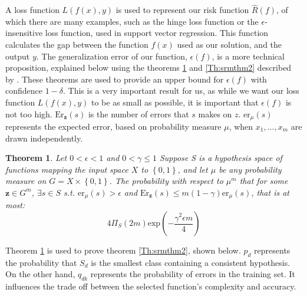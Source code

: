 A loss function $L(f(x),y)$ is used to represent our risk function $\hat{R}(f)$, of which there are many examples, such as the hinge loss function or the $\epsilon$-insensitive loss function, used in support vector regression. This function calculates the gap between the function $f(x)$ used as our solution, and the output $y$. \newline
The generalization error of our function, $\epsilon(f)$, is a more technical proposition, explained below using the theorems \ref{Th:srmthm1} and \ref{Th:srmthm2} described by \citet{shawetaylorsrm}. These theorems are used to provide an upper bound for $\epsilon(f)$ with confidence $1-\delta$. This is a very important result for us, as while we want our loss function $L(f(x),y)$ to be as small as possible, it is important that $\epsilon(f)$ is not too high. 
\newline
$\mathrm{Er}_{\mathbf{z}}(s)$ is the number of errors that $s$ makes on $z$. $\mathrm{er}_{\mu}(s)$ represents the expected error, based on probability measure $\mu$, when $x_1,\dots,x_m$ are drawn independently.

\newtheorem{srmtheorem}{Theorem}[section]
\begin{srmtheorem} \label{Th:srmthm1}
Let $0<\epsilon<1$ and $0<\gamma\leq1$ Suppose S is a hypothesis space of functions mapping the input space $X$ to $\left\{0,1\right\}$, and let $\mu$ be any probability measure on $G=X\times\left\{0,1\right\}$. The probability with respect to $\mu^m$ that for some $\mathbf{z}\in G^m$, $\exists s \in S$ s.t. $\mathrm{er}_{\mu}(s)>\epsilon$ and $\mathrm{Er}_{\mathbf{z}}(s)\leq m(1-\gamma)\mathrm{er}_{\mu}(s)$, that is at most:
\begin{equation}\label{srmeqn1}
4\Pi_{S}(2m)\mathrm{exp}\left(-\frac{\gamma^2\epsilon m}{4}\right)
\end{equation}
\end{srmtheorem}

Theorem \ref{Th:srmthm1} is used to prove theorem \ref{Th:srmthm2}, shown below. $p_{d}$ represents the probability that $S_d$ is the smallest class containing a consistent hypothesis. On the other hand, $q_{dk}$ represents the probability of errors in the training set. It influences the trade off between the selected function's complexity and accuracy.


